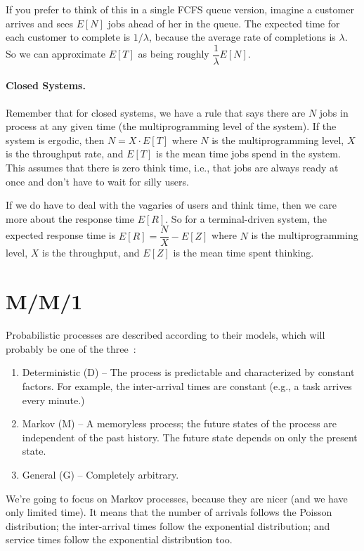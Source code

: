 If you prefer to think of this in a single FCFS queue version, imagine a customer arrives and sees $E[N]$ jobs ahead of her in the queue. The expected time for each customer to complete is $1/\lambda$, because the average rate of completions is $\lambda $. So we can approximate $E[T]$ as being roughly $\dfrac{1}{\lambda}E[N]$.

\paragraph{Closed Systems.} Remember that for closed systems, we have a rule that says there are $N$ jobs in process at any given time (the multiprogramming level of the system). If the system is ergodic, then $N = X \cdot E[T]$ where $N$ is the multiprogramming level, $X$ is the throughput rate, and $E[T]$ is the mean time jobs spend in the system. This assumes that there is zero think time, i.e., that jobs are always ready at once and don't have to wait for silly users.

If we do have to deal with the vagaries of users and think time, then we care more about the response time $E[R]$. So for a terminal-driven system, the expected response time is $E[R] = \dfrac{N}{X} - E[Z]$ where $N$ is the multiprogramming level, $X$ is the throughput, and $E[Z]$ is the mean time spent thinking. 

\section*{M/M/1}

Probabilistic processes are described according to their models, which will probably be one of the three~\cite{swps}:

\begin{enumerate}
	\item Deterministic (D) -- The process is predictable and characterized by constant factors. For example, the inter-arrival times are constant (e.g., a task arrives every minute.)
	\item Markov (M) -- A memoryless process; the future states of the process are independent of the past history. The future state depends on only the present state.
	\item General (G) -- Completely arbitrary.
\end{enumerate}

We're going to focus on Markov processes, because they are nicer (and we have only limited time). It means that the number of arrivals follows the Poisson distribution; the inter-arrival times follow the exponential distribution; and service times follow the exponential distribution too. 

